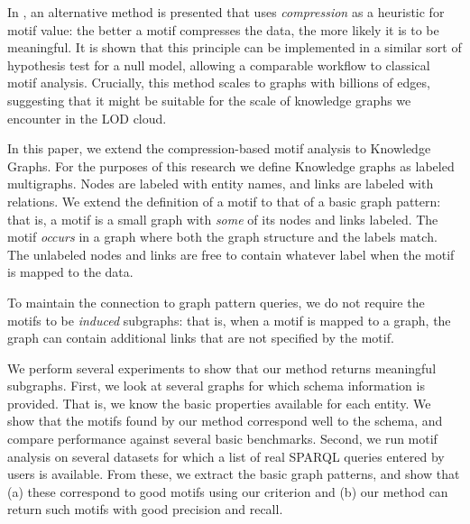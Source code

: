 \documentclass[11pt]{article}
\begin{document}

In \cite{bloem2017large}, an alternative method is presented that uses \emph{compression} as a heuristic for motif value: the better a motif compresses the data, the more likely it is to be meaningful. It is shown that this principle can be implemented in a similar sort of hypothesis test for a null model, allowing a comparable workflow to classical motif analysis. Crucially, this method scales to graphs with billions of edges, suggesting that it might be suitable for the scale of knowledge graphs we encounter in the LOD cloud.

In this paper, we extend the compression-based motif analysis to Knowledge Graphs. For the purposes of this research we define Knowledge graphs as labeled multigraphs. Nodes are labeled with entity names, and links are labeled with relations. We extend the definition of a motif to that of a basic graph pattern: that is, a motif is a small graph with \emph{some} of its nodes and links labeled. The motif \emph{occurs} in a graph where both the graph structure and the labels match. The unlabeled nodes and links are free to contain whatever label when the motif is mapped to the data. 

To maintain the connection to graph pattern queries, we do not require the motifs to be \emph{induced} subgraphs: that is, when a motif is mapped to a graph, the graph can contain additional links that are not specified by the motif. 

We perform several experiments to show that our method returns meaningful subgraphs. First, we look at several graphs for which schema information is provided. That is, we know the basic properties available for each entity. We show that the motifs found by our method correspond well to the schema, and compare performance against several basic benchmarks. Second, we run motif analysis on several datasets for which a list of real SPARQL queries entered by users is available. From these, we extract the basic graph patterns, and show that (a) these correspond to good motifs using our criterion and (b) our method can return such motifs with good precision and recall.
\end{document}
